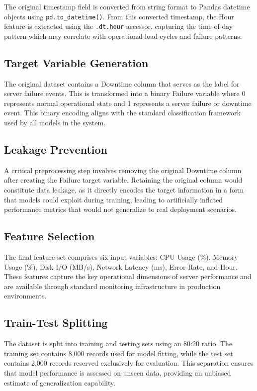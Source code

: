 \documentclass[12pt,letterpaper]{report}
\begin{document}
The original timestamp field is converted from string format to Pandas datetime objects using \texttt{pd.to\_datetime()}. From this converted timestamp, the Hour feature is extracted using the \texttt{.dt.hour} accessor, capturing the time-of-day pattern which may correlate with operational load cycles and failure patterns.

\subsection{Target Variable Generation}

The original dataset contains a Downtime column that serves as the label for server failure events. This is transformed into a binary Failure variable where 0 represents normal operational state and 1 represents a server failure or downtime event. This binary encoding aligns with the standard classification framework used by all models in the system.

\subsection{Leakage Prevention}

A critical preprocessing step involves removing the original Downtime column after creating the Failure target variable. Retaining the original column would constitute data leakage, as it directly encodes the target information in a form that models could exploit during training, leading to artificially inflated performance metrics that would not generalize to real deployment scenarios.

\subsection{Feature Selection}

The final feature set comprises six input variables: CPU Usage (\%), Memory Usage (\%), Disk I/O (MB/s), Network Latency (ms), Error Rate, and Hour. These features capture the key operational dimensions of server performance and are available through standard monitoring infrastructure in production environments.

\subsection{Train-Test Splitting}

The dataset is split into training and testing sets using an 80:20 ratio. The training set contains 8,000 records used for model fitting, while the test set contains 2,000 records reserved exclusively for evaluation. This separation ensures that model performance is assessed on unseen data, providing an unbiased estimate of generalization capability.
\end{document}
